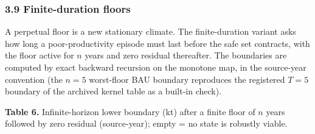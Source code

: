 \subsubsection{3.9 Finite-duration floors}\label{budget-finite-duration-floors}

A perpetual floor is a new stationary climate. The finite-duration
variant asks how long a poor-productivity episode must last before the
safe set contracts, with the floor active for \(n\) years and zero
residual thereafter. The boundaries are computed by exact backward
recursion on the monotone map, in the source-year convention (the
\(n=5\) worst-floor BAU boundary reproduces the registered \(T=5\)
boundary of the archived kernel table as a built-in check).

\textbf{Table 6.} Infinite-horizon lower boundary (kt) after a finite
floor of \(n\) years followed by zero residual (source-year); empty = no
state is robustly viable.

